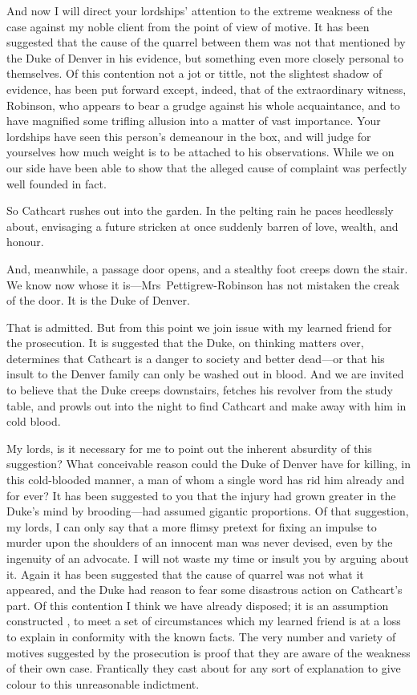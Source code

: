 \begin{dialogue}
And now I will direct your lordships' attention to the extreme weakness of the case against my noble client from the point of view of motive. It has been suggested that the cause of the quarrel between them was not that mentioned by the Duke of Denver in his evidence, but something even more closely personal to themselves. Of this contention not a jot or tittle, not the slightest shadow of evidence, has been put forward except, indeed, that of the extraordinary witness, Robinson, who appears to bear a grudge against his whole acquaintance, and to have magnified some trifling allusion into a matter of vast importance. Your lordships have seen this person's demeanour in the box, and will judge for yourselves how much weight is to be attached to his observations. While we on our side have been able to show that the alleged cause of complaint was perfectly well founded in fact.

So Cathcart rushes out into the garden. In the pelting rain he paces heedlessly about, envisaging a future stricken at once suddenly barren of love, wealth, and honour.

And, meanwhile, a passage door opens, and a stealthy foot creeps down the stair. We know now whose it is—Mrs~Pettigrew-Robinson has not mistaken the creak of the door. It is the Duke of Denver.

That is admitted. But from this point we join issue with my learned friend for the prosecution. It is suggested that the Duke, on thinking matters over, determines that Cathcart is a danger to society and better dead—or that his insult to the Denver family can only be washed out in blood. And we are invited to believe that the Duke creeps downstairs, fetches his revolver from the study table, and prowls out into the night to find Cathcart and make away with him in cold blood.

My lords, is it necessary for me to point out the inherent absurdity of this suggestion? What conceivable reason could the Duke of Denver have for killing, in this cold-blooded manner, a man of whom a single word has rid him already and for ever? It has been suggested to you that the injury had grown greater in the Duke's mind by brooding—had assumed gigantic proportions. Of that suggestion, my lords, I can only say that a more flimsy pretext for fixing an impulse to murder upon the shoulders of an innocent man was never devised, even by the ingenuity of an advocate. I will not waste my time or insult you by arguing about it. Again it has been suggested that the cause of quarrel was not what it appeared, and the Duke had reason to fear some disastrous action on Cathcart's part. Of this contention I think we have already disposed; it is an assumption constructed , to meet a set of circumstances which my learned friend is at a loss to explain in conformity with the known facts. The very number and variety of motives suggested by the prosecution is proof that they are aware of the weakness of their own case. Frantically they cast about for any sort of explanation to give colour to this unreasonable indictment.


\end{dialogue}
